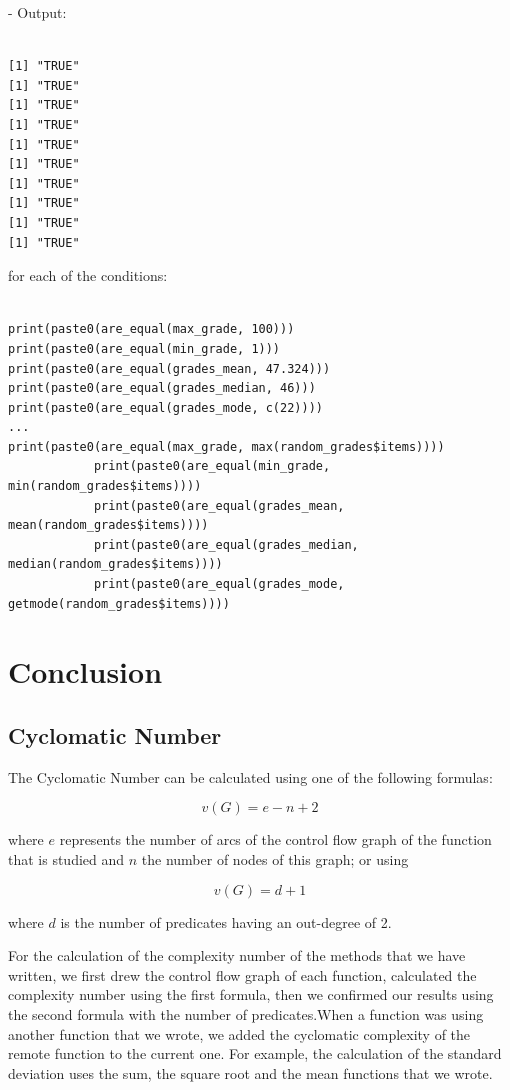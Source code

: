 \documentclass[11pt]{article}
\begin{document}
- Output:

\begin{lstlisting}

[1] "TRUE"
[1] "TRUE"
[1] "TRUE"
[1] "TRUE"
[1] "TRUE"
[1] "TRUE"
[1] "TRUE"
[1] "TRUE"
[1] "TRUE"
[1] "TRUE"

\end{lstlisting}

for each of the conditions:

\begin{lstlisting}

print(paste0(are_equal(max_grade, 100)))
print(paste0(are_equal(min_grade, 1)))
print(paste0(are_equal(grades_mean, 47.324)))
print(paste0(are_equal(grades_median, 46)))
print(paste0(are_equal(grades_mode, c(22))))
...
print(paste0(are_equal(max_grade, max(random_grades$items))))
            print(paste0(are_equal(min_grade, min(random_grades$items))))
            print(paste0(are_equal(grades_mean, mean(random_grades$items))))
            print(paste0(are_equal(grades_median, median(random_grades$items))))
            print(paste0(are_equal(grades_mode, getmode(random_grades$items))))

\end{lstlisting}

\newpage

\section{Conclusion}

\subsection{Cyclomatic Number}

The Cyclomatic Number can be calculated using one of the following formulas:

$$ v(G) = e - n + 2 $$

where $ e $ represents the number of arcs of the control flow graph of the function that is studied and $ n $ the number of nodes of this graph; or using

$$ v(G) = d + 1 $$

where $ d $ is the number of predicates having an out-degree of 2.\newline 

For the calculation of the complexity number of the methods that we have written, we first drew the control flow graph of each function, calculated the complexity number using the first formula, then we confirmed our results using the second formula with the number of predicates.\newline When a function was using another function that we wrote, we added the cyclomatic complexity of the remote function to the current one. For example, the calculation of the standard deviation uses the sum, the square root and the mean functions that we wrote.\newline
\end{document}
